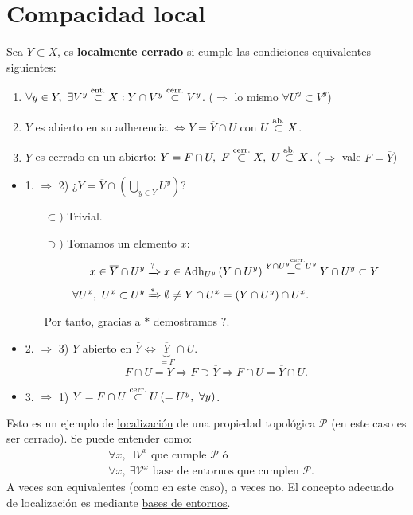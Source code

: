 \chapter{Compacidad local}%
\label{cha:compacidad_local}
\begin{defi}
Sea $Y \subset X$, es \textbf{localmente cerrado} si cumple las condiciones equivalentes siguientes:
\begin{enumerate}
    \item $\forall y \in Y,\ \exists V^y \stackrel{\text{ent.}}{\subset} X: Y \cap V^y \stackrel{\text{cerr.}}{\subset} V^y$. ($\Rightarrow$ lo mismo $\forall U^y \subset V^y$)
    \item $Y$ es abierto en su adherencia $\Leftrightarrow Y = \overline{Y} \cap U$ con $U \stackrel{\text{ab.}}{\subset} X$.
    \item $Y$ es cerrado en un abierto: $Y = F \cap U,\ F \stackrel{\text{cerr.}}{\subset} X,\ U \stackrel{\text{ab.}}{\subset} X$. ($\Rightarrow$ vale $F = \overline{Y}$)
\end{enumerate}
\end{defi}
\begin{demo}
\begin{itemize}
    \item 1. $\Rightarrow$ 2) ¿$Y = \overline{Y} \cap \left( \bigcup_{y \in Y} U^y \right)$?
    \begin{itemize}
        \item[$\subset)$] Trivial.
        \item[$\supset)$] Tomamos un elemento $x$:
            \begin{align*}
                x \in \overline{Y} \cap U^y &\xRightarrow{?} x \in \operatorname{Adh}_{U^y} \left( Y \cap U^y \right) \stackrel{Y \cap U^y \stackrel{\text{cerr.}}{\subset} U^y}{=} Y \cap U^y \subset Y\\
                \forall U^x,\ U^x \subset U^y &\xRightarrow{*} \emptyset \neq Y \cap U^x = \left( Y \cap U^y \right) \cap U^x
            .\end{align*}
            Por tanto, gracias a $*$ demostramos $?$.
    \end{itemize}
    \item 2. $\Rightarrow$ 3) $Y$ abierto en $\overline{Y} \Leftrightarrow \underbrace{\overline{Y}}_{= F} \cap U$.
    \[
    F \cap U = Y \Rightarrow F \supset \overline{Y} \Rightarrow F \cap U = \overline{Y} \cap U.
    \]
    \item 3. $\Rightarrow$ 1) $Y = F \cap U \cerr U \left( = U^y,\ \forall y \right)$.
\end{itemize}
\end{demo}

Esto es un ejemplo de \underline{localización} de una propiedad topológica $\mathcal{P}$ (en este caso es ser cerrado). Se puede entender como:
\begin{align*}
    &\forall x,\ \exists V^x \text{ que cumple } \mathcal{P} \text{ ó } \\
    &\forall x,\ \exists \mathcal{V}^x \text{ base de entornos que cumplen } \mathcal{P} 
.\end{align*}
A veces son equivalentes (como en este caso), a veces no. El concepto adecuado de localización es mediante \underline{bases de entornos}.

